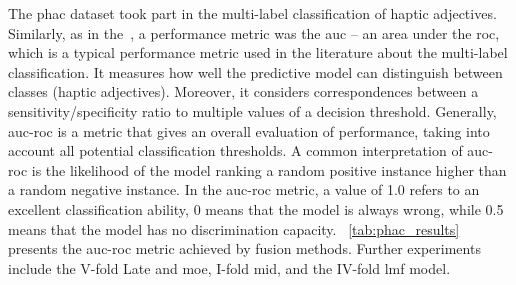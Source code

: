 \documentclass[a4paper, 10pt, twoside]{report}
\begin{document}
The \acrshort{phac} dataset took part in the multi-label classification of haptic adjectives. Similarly, as in the~\cite{haptic_from_vision_and_biotac}, a performance metric was the \acrfull{auc} -- an area under the \acrfull{roc}, which is a typical performance metric used in the literature about the multi-label classification. It measures how well the predictive model can distinguish between classes (haptic adjectives). Moreover, it considers correspondences between a sensitivity/specificity ratio to multiple values of a decision threshold. Generally, \acrshort{auc}-\acrshort{roc} is a metric that gives an overall evaluation of performance, taking into account all potential classification thresholds. A common interpretation of \acrshort{auc}-\acrshort{roc} is the likelihood of the model ranking a random positive instance higher than a random negative instance. In the \acrshort{auc}-\acrshort{roc} metric, a value of 1.0 refers to an excellent classification ability, 0 means that the model is always wrong, while 0.5 means that the model has no discrimination capacity. \Table~\ref{tab:phac_results} presents the \acrshort{auc}-\acrshort{roc} metric achieved by fusion methods. Further experiments include the V-fold Late and \acrshort{moe}, I-fold \acrshort{mid}, and the IV-fold \acrshort{lmf} model.
\end{document}

